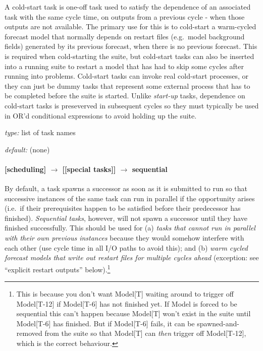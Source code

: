 A cold-start task is one-off task used to satisfy the dependence of an
associated task with the same cycle time, on outputs from a previous
cycle - when those outputs are not available.  The primary use for this
is to cold-start a warm-cycled forecast model that normally depends on
restart files (e.g.\ model background fields) generated by its previous
forecast, when there is no previous forecast.  This is required when
cold-starting the suite, but cold-start tasks can also be inserted into
a running suite to restart a model that has had to skip some cycles
after running into problems. Cold-start tasks can invoke real cold-start
processes, or they can just be dummy tasks that represent some external
process that has to be completed before the suite is started. Unlike
{\em start-up} tasks, dependence on cold-start tasks is preseverved in
subsequent cycles so they must typically be used in OR'd conditional
expressions to avoid holding up the suite.

\begin{myitemize}
    \item {\em type:} list of task names
    \item {\em default:} (none)
\end{myitemize}

\paragraph[sequential]{[scheduling] $\rightarrow$ [[special tasks]] $\rightarrow$ sequential}

By default, a task spawns a successor as soon as it is submitted to run
so that successive instances of the same task can run in parallel if the
opportunity arises (i.e.\ if their prerequisites happen to be satisfied
before their predecessor has finished). {\em Sequential tasks}, however,
will not spawn a successor until they have finished successfully. This
should be used for (a) {\em tasks that cannot run in parallel with their
own previous instances} because they would somehow interfere with each
other (use cycle time in all I/O paths to avoid this); and (b) {\em warm
cycled forecast models that write out restart files for multiple cycles
ahead} (exception: see ``explicit restart outputs''
below).\footnote{This is because you don't want Model[T] waiting around
to trigger off Model[T-12] if Model[T-6] has not finished yet. If Model
is forced to be sequential this can't happen because Model[T] won't
exist in the suite until Model[T-6] has finished. But if Model[T-6]
fails, it can be spawned-and-removed from the suite so that Model[T] can
{\em then} trigger off Model[T-12], which is the correct behaviour.} 

